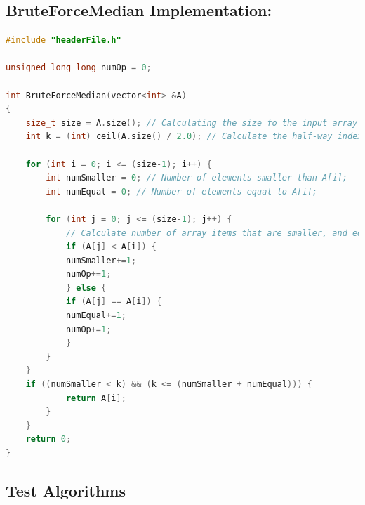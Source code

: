 \documentclass[12pt]{article}
\begin{document}
\subsection{BruteForceMedian Implementation:}

\begin{lstlisting}[caption={BruteForceMedian algorithm implementation for the number of operations, stored in the \textit{algorithmOps.cpp} file.},label={lst:bruteforceops},language=C++,]
#include "headerFile.h"

unsigned long long numOp = 0;

int BruteForceMedian(vector<int> &A)
{
	size_t size = A.size(); // Calculating the size fo the input array
	int k = (int) ceil(A.size() / 2.0); // Calculate the half-way index of the array.
	
	for (int i = 0; i <= (size-1); i++) {
		int numSmaller = 0; // Number of elements smaller than A[i];
		int numEqual = 0; // Number of elements equal to A[i];
		
		for (int j = 0; j <= (size-1); j++) {
			// Calculate number of array items that are smaller, and equal.
			if (A[j] < A[i]) {
			numSmaller+=1;
			numOp+=1;
			} else {
			if (A[j] == A[i]) {
			numEqual+=1;
			numOp+=1;
			}
		}
	}
	if ((numSmaller < k) && (k <= (numSmaller + numEqual))) {
			return A[i];
		}
	}
	return 0;
}

\end{lstlisting}


\subsection{Test Algorithms}
\end{document}
